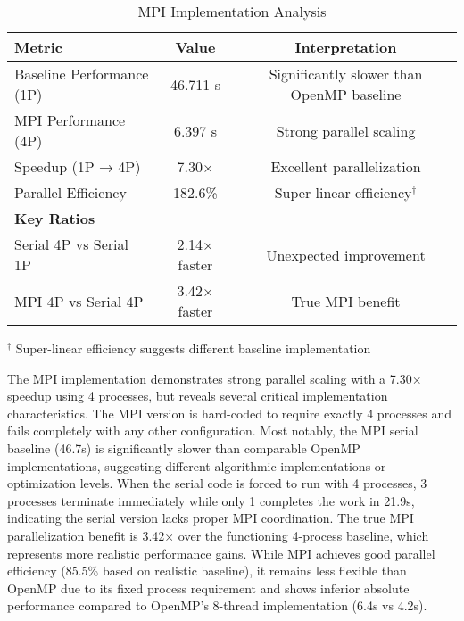 \documentclass[11pt]{article}
\begin{document}
\vspace{1em}

\begin{table}[H]
\centering
\caption{MPI Implementation Analysis}
\label{tab:mpi_analysis}
\begin{tabular}{lcc}
\hline
\textbf{Metric} & \textbf{Value} & \textbf{Interpretation} \\
\hline
Baseline Performance (1P) & 46.711 s & Significantly slower than OpenMP baseline \\
MPI Performance (4P) & 6.397 s & Strong parallel scaling \\
Speedup (1P → 4P) & 7.30$\times$ & Excellent parallelization \\
Parallel Efficiency & 182.6\% & Super-linear efficiency$^{\dagger}$ \\
\hline
\textbf{Key Ratios} & & \\
Serial 4P vs Serial 1P & 2.14$\times$ faster & Unexpected improvement \\
MPI 4P vs Serial 4P & 3.42$\times$ faster & True MPI benefit \\
\hline
\end{tabular}
\end{table}
\vspace{0.5em}
\begin{footnotesize}
\footnotesize{
$^{\dagger}$ Super-linear efficiency suggests different baseline implementation
}
\end{footnotesize}

The MPI implementation demonstrates strong parallel scaling with a 7.30× speedup using 4 processes, but reveals several critical implementation characteristics. The MPI version is hard-coded to require exactly 4 processes and fails completely with any other configuration. Most notably, the MPI serial baseline (46.7s) is significantly slower than comparable OpenMP implementations, suggesting different algorithmic implementations or optimization levels. When the serial code is forced to run with 4 processes, 3 processes terminate immediately while only 1 completes the work in 21.9s, indicating the serial version lacks proper MPI coordination. The true MPI parallelization benefit is 3.42× over the functioning 4-process baseline, which represents more realistic performance gains. While MPI achieves good parallel efficiency (85.5\% based on realistic baseline), it remains less flexible than OpenMP due to its fixed process requirement and shows inferior absolute performance compared to OpenMP's 8-thread implementation (6.4s vs 4.2s).
%
\end{document}
